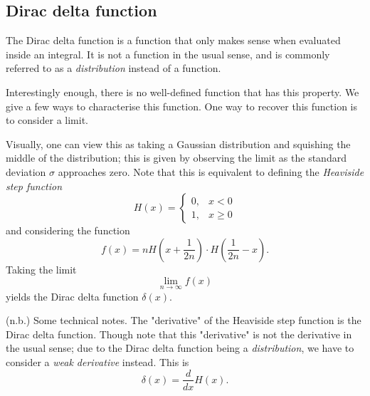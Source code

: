 \documentclass[a4paper, 12pt,oneside,openany]{book}
\begin{document}
\subsection{Dirac delta function}

The Dirac delta function is a function that only makes sense when evaluated inside an integral. It is not a function in the usual sense, and is commonly referred to as a \emph{distribution} instead of a function. 


Interestingly enough, there is no well-defined function that has this property. We give a few ways to characterise this function. One way to recover this function is to consider a limit. 


Visually, one can view this as taking a Gaussian distribution and squishing the middle of the distribution; this is given by observing the limit as the standard deviation $\sigma$ approaches zero. Note that this is equivalent to defining the \emph{Heaviside step function} $$H(x) = \begin{cases} 0, & x< 0 \\ 1, & x \geq0 \end{cases}$$ and considering the function $$f(x) = nH(x+\frac{1}{2n})\cdot H(\frac{1}{2n}-x).$$ Taking the limit $$\lim\limits_{n\to\infty} f(x)$$ yields the Dirac delta function $\delta(x)$. 

(n.b.) Some technical notes. The "derivative" of the Heaviside step function is the Dirac delta function. Though note that this "derivative" is not the derivative in the usual sense; due to the Dirac delta function being a \emph{distribution}, we have to consider a \emph{weak derivative} instead. This is $$\delta(x) = \frac{d}{dx} H(x).$$
\end{document}
